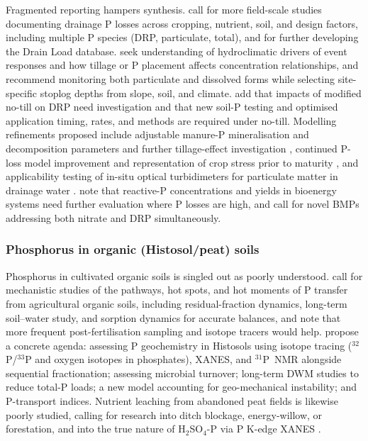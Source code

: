 Fragmented reporting hampers synthesis. \textcite{Christianson2016} call for more field-scale studies documenting drainage P losses across cropping, nutrient, soil, and design factors, including multiple P species (DRP, particulate, total), and for further developing the Drain Load database. \textcite{Macrae2019} seek understanding of hydroclimatic drivers of event responses and how tillage or P placement affects concentration relationships, and \textcite{Tanga2025} recommend monitoring both particulate and dissolved forms while selecting site-specific stoplog depths from slope, soil, and climate. \textcite{Zhang2017} add that impacts of modified no-till on DRP need investigation and that new soil-P testing and optimised application timing, rates, and methods are required under no-till. Modelling refinements proposed include adjustable manure-P mineralisation and decomposition parameters and further tillage-effect investigation \parencite{Pan2023}, continued P-loss model improvement and representation of crop stress prior to maturity \parencite{Wang2019}, and applicability testing of in-situ optical turbidimeters for particulate matter in drainage water \parencite{Grant1996}. \textcite{Daigh2015b} note that reactive-P concentrations and yields in bioenergy systems need further evaluation where P losses are high, and \textcite{Spiese2023} call for novel BMPs addressing both nitrate and DRP simultaneously.

\subsubsection{Phosphorus in organic (Histosol/peat) soils}

Phosphorus in cultivated organic soils is singled out as poorly understood. \textcite{Grenon2022} call for mechanistic studies of the pathways, hot spots, and hot moments of P transfer from agricultural organic soils, including residual-fraction dynamics, long-term soil--water study, and sorption dynamics for accurate balances, and note that more frequent post-fertilisation sampling and isotope tracers would help. \textcite{Grenon2021} propose a concrete agenda: assessing P geochemistry in Histosols using isotope tracing ($^{32}$P/$^{33}$P and oxygen isotopes in phosphates), XANES, and $^{31}$P~NMR alongside sequential fractionation; assessing microbial turnover; long-term DWM studies to reduce total-P loads; a new model accounting for geo-mechanical instability; and P-transport indices. Nutrient leaching from abandoned peat fields is likewise poorly studied, calling for research into ditch blockage, energy-willow, or forestation, and into the true nature of H$_2$SO$_4$-P via P K-edge XANES \parencite{Höyhtyä2025}.

